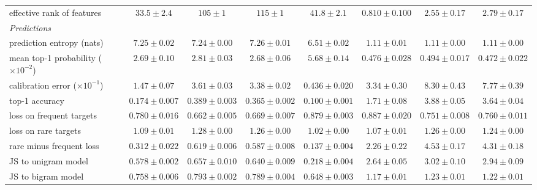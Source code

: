 \begin{center}
\begin{minipage}{\linewidth}
{\begin{tabular}{@{}l|cccc|ccc@{}}
effective rank of features & $33.5 \pm 2.4$ & $105 \pm 1$ & $115 \pm 1$ & $41.8 \pm 2.1$ & $0.810 \pm 0.100$ & $2.55 \pm 0.17$ & $2.79 \pm 0.17$ \\
\emph{Predictions} & & & & & & & \\
prediction entropy (nats) & $7.25 \pm 0.02$ & $7.24 \pm 0.00$ & $7.26 \pm 0.01$ & $6.51 \pm 0.02$ & $1.11 \pm 0.01$ & $1.11 \pm 0.00$ & $1.11 \pm 0.00$ \\
mean top-1 probability ($\times10^{-2}$) & $2.69 \pm 0.10$ & $2.81 \pm 0.03$ & $2.68 \pm 0.06$ & $5.68 \pm 0.14$ & $0.476 \pm 0.028$ & $0.494 \pm 0.017$ & $0.472 \pm 0.022$ \\
calibration error ($\times10^{-1}$) & $1.47 \pm 0.07$ & $3.61 \pm 0.03$ & $3.38 \pm 0.02$ & $0.436 \pm 0.020$ & $3.34 \pm 0.30$ & $8.30 \pm 0.43$ & $7.77 \pm 0.39$ \\
top-1 accuracy & $0.174 \pm 0.007$ & $0.389 \pm 0.003$ & $0.365 \pm 0.002$ & $0.100 \pm 0.001$ & $1.71 \pm 0.08$ & $3.88 \pm 0.05$ & $3.64 \pm 0.04$ \\
loss on frequent targets & $0.780 \pm 0.016$ & $0.662 \pm 0.005$ & $0.669 \pm 0.007$ & $0.879 \pm 0.003$ & $0.887 \pm 0.020$ & $0.751 \pm 0.008$ & $0.760 \pm 0.011$ \\
loss on rare targets & $1.09 \pm 0.01$ & $1.28 \pm 0.00$ & $1.26 \pm 0.00$ & $1.02 \pm 0.00$ & $1.07 \pm 0.01$ & $1.26 \pm 0.00$ & $1.24 \pm 0.00$ \\
rare minus frequent loss & $0.312 \pm 0.022$ & $0.619 \pm 0.006$ & $0.587 \pm 0.008$ & $0.137 \pm 0.004$ & $2.26 \pm 0.22$ & $4.53 \pm 0.17$ & $4.31 \pm 0.18$ \\
JS to unigram model & $0.578 \pm 0.002$ & $0.657 \pm 0.010$ & $0.640 \pm 0.009$ & $0.218 \pm 0.004$ & $2.64 \pm 0.05$ & $3.02 \pm 0.10$ & $2.94 \pm 0.09$ \\
JS to bigram model & $0.758 \pm 0.006$ & $0.793 \pm 0.002$ & $0.789 \pm 0.004$ & $0.648 \pm 0.003$ & $1.17 \pm 0.01$ & $1.23 \pm 0.01$ & $1.22 \pm 0.01$ \\
\end{tabular}}\end{minipage}
\end{center}

